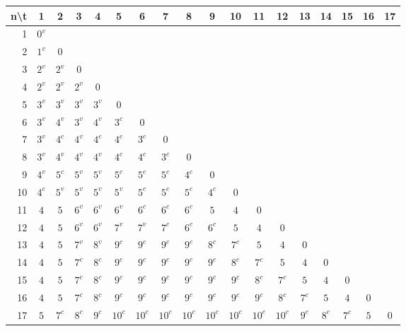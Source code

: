 \begin{tabular}{rccccccccccccccccc}
n\backslash t & 1 & 2 & 3 & 4 & 5 & 6 & 7 & 8 & 9 & 10 & 11 & 12 & 13 & 14 & 15 & 16 & 17 \\
\hline
1 & $0^{v}$ &  &  &  &  &  &  &  &  &  &  &  &  &  &  &  &  \\
2 & $1^{v}$ & $0$ &  &  &  &  &  &  &  &  &  &  &  &  &  &  &  \\
3 & $2^{v}$ & $2^{v}$ & $0$ &  &  &  &  &  &  &  &  &  &  &  &  &  &  \\
4 & $2^{v}$ & $2^{v}$ & $2^{v}$ & $0$ &  &  &  &  &  &  &  &  &  &  &  &  &  \\
5 & $3^{v}$ & $3^{v}$ & $3^{v}$ & $3^{v}$ & $0$ &  &  &  &  &  &  &  &  &  &  &  &  \\
6 & $3^{v}$ & $4^{v}$ & $3^{v}$ & $4^{v}$ & $3^{c}$ & $0$ &  &  &  &  &  &  &  &  &  &  &  \\
7 & $3^{v}$ & $4^{c}$ & $4^{v}$ & $4^{c}$ & $4^{c}$ & $3^{c}$ & $0$ &  &  &  &  &  &  &  &  &  &  \\
8 & $3^{v}$ & $4^{v}$ & $4^{v}$ & $4^{v}$ & $4^{c}$ & $4^{c}$ & $3^{c}$ & $0$ &  &  &  &  &  &  &  &  &  \\
9 & $4^{v}$ & $5^{c}$ & $5^{v}$ & $5^{v}$ & $5^{c}$ & $5^{c}$ & $5^{c}$ & $4^{c}$ & $0$ &  &  &  &  &  &  &  &  \\
10 & $4^{c}$ & $5^{v}$ & $5^{v}$ & $5^{v}$ & $5^{v}$ & $5^{c}$ & $5^{c}$ & $5^{c}$ & $4^{c}$ & $0$ &  &  &  &  &  &  &  \\
11 & $4$ & $5$ & $6^{v}$ & $6^{v}$ & $6^{v}$ & $6^{c}$ & $6^{c}$ & $6^{c}$ & $5$ & $4$ & $0$ &  &  &  &  &  &  \\
12 & $4$ & $5$ & $6^{v}$ & $6^{v}$ & $7^{v}$ & $7^{v}$ & $7^{c}$ & $6^{c}$ & $6^{c}$ & $5$ & $4$ & $0$ &  &  &  &  &  \\
13 & $4$ & $5$ & $7^{v}$ & $8^{v}$ & $9^{c}$ & $9^{c}$ & $9^{c}$ & $9^{c}$ & $8^{c}$ & $7^{c}$ & $5$ & $4$ & $0$ &  &  &  &  \\
14 & $4$ & $5$ & $7^{c}$ & $8^{c}$ & $9^{c}$ & $9^{c}$ & $9^{c}$ & $9^{c}$ & $9^{c}$ & $8^{c}$ & $7^{c}$ & $5$ & $4$ & $0$ &  &  &  \\
15 & $4$ & $5$ & $7^{c}$ & $8^{c}$ & $9^{c}$ & $9^{c}$ & $9^{c}$ & $9^{c}$ & $9^{c}$ & $9^{c}$ & $8^{c}$ & $7^{c}$ & $5$ & $4$ & $0$ &  &  \\
16 & $4$ & $5$ & $7^{c}$ & $8^{c}$ & $9^{c}$ & $9^{c}$ & $9^{c}$ & $9^{c}$ & $9^{c}$ & $9^{c}$ & $9^{c}$ & $8^{c}$ & $7^{c}$ & $5$ & $4$ & $0$ &  \\
17 & $5$ & $7^{c}$ & $8^{c}$ & $9^{c}$ & $10^{c}$ & $10^{c}$ & $10^{c}$ & $10^{c}$ & $10^{c}$ & $10^{c}$ & $10^{c}$ & $10^{c}$ & $9^{c}$ & $8^{c}$ & $7^{c}$ & $5$ & $0$ \\
\end{tabular}
